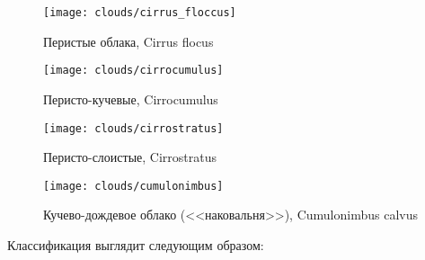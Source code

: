 \begin{savenotes}
{\begin{figure}
\end{figure}

\begin{figure}
  \centering
  \texttt{[image: clouds/cirrus\_floccus]}
  \caption{Перистые облака, Cirrus flocus}
  \label{fig:115}

\end{figure}

\begin{figure}
  \centering
  \texttt{[image: clouds/cirrocumulus]}
  \caption{Перисто-кучевые, Cirrocumulus}
  \label{fig:cirrocumulus}

\end{figure}

\begin{figure}
  \centering
  \texttt{[image: clouds/cirrostratus]}
  \caption{Перисто-слоистые, Cirrostratus}
  \label{fig:cirrostratus}

\end{figure}

\begin{figure}
  \centering
  \texttt{[image: clouds/cumulonimbus]}
  \caption{Кучево-дождевое облако (<<наковальня>>), Cumulonimbus calvus}
  \label{fig:113}

\end{figure}

\clearpage
}
\end{savenotes}

Классификация выглядит следующим образом:

